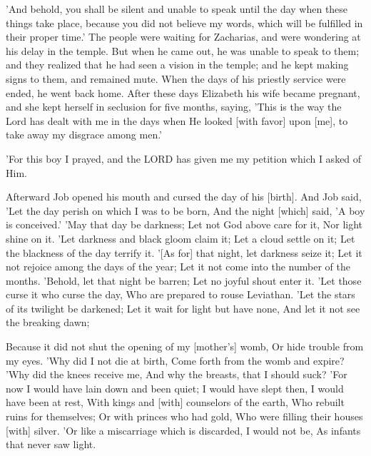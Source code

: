 \begin{scripture}[Luke 1:20-25]
    'And behold, you shall be silent and unable to speak until the day when these things take place, because you did not believe my words, which will be fulfilled in their proper time.'
    The people were waiting for Zacharias, and were wondering at his delay in the temple.
    But when he came out, he was unable to speak to them; and they realized that he had seen a vision in the temple; and he kept making signs to them, and remained mute.
    When the days of his priestly service were ended, he went back home.
    After these days Elizabeth his wife became pregnant, and she kept herself in seclusion for five months, saying,
    'This is the way the Lord has dealt with me in the days when He looked [with favor] upon [me], to take away my disgrace among men.'
\end{scripture}

\begin{scripture}[1 Samuel 1:27]
    'For this boy I prayed, and the LORD has given me my petition which I asked of Him.
\end{scripture}

\begin{scripture}[Job 3:1-9]
    Afterward Job opened his mouth and cursed the day of his [birth].
    And Job said,
    'Let the day perish on which I was to be born, And the night [which] said, 'A boy is conceived.'
    'May that day be darkness; Let not God above care for it, Nor light shine on it.
    'Let darkness and black gloom claim it; Let a cloud settle on it; Let the blackness of the day terrify it.
    '[As for] that night, let darkness seize it; Let it not rejoice among the days of the year; Let it not come into the number of the months.
    'Behold, let that night be barren; Let no joyful shout enter it.
    'Let those curse it who curse the day, Who are prepared to rouse Leviathan.
    'Let the stars of its twilight be darkened; Let it wait for light but have none, And let it not see the breaking dawn;
\end{scripture}

\begin{scripture}[Job 3:10-16]
    Because it did not shut the opening of my [mother's] womb, Or hide trouble from my eyes.
    'Why did I not die at birth, Come forth from the womb and expire?
    'Why did the knees receive me, And why the breasts, that I should suck?
    'For now I would have lain down and been quiet; I would have slept then, I would have been at rest,
    With kings and [with] counselors of the earth, Who rebuilt ruins for themselves;
    Or with princes who had gold, Who were filling their houses [with] silver.
    'Or like a miscarriage which is discarded, I would not be, As infants that never saw light.
\end{scripture}

